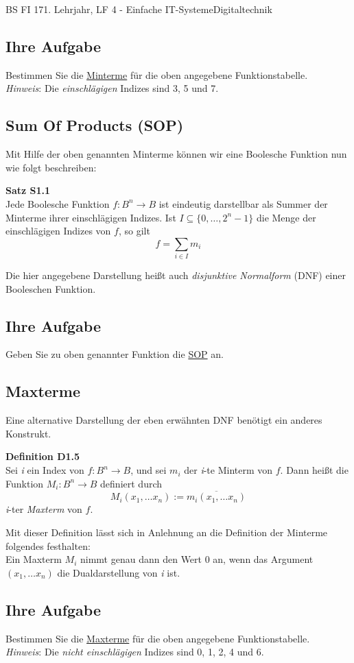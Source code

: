 \documentclass[11pt,twocolumn,oneside,openany,headings=optiontotoc,11pt,numbers=noenddot]{article}
\begin{document}
\begin{worksheet}{BS FI 17}{1. Lehrjahr, LF 4 - Einfache IT-Systeme}{Digitaltechnik}
		\subsection*{Ihre Aufgabe} Bestimmen Sie die \underline{Minterme} für die oben angegebene Funktionstabelle.\\
		\textit{Hinweis}: Die \textit{einschlägigen} Indizes sind 3, 5 und 7.
		\subsection{Sum Of Products (SOP)} Mit Hilfe der oben genannten Minterme können wir eine Boolesche Funktion nun wie folgt beschreiben:
		\begin{framed}
			\textbf{Satz S1.1}\\ Jede Boolesche Funktion \(f: B^n \rightarrow B\) ist eindeutig darstellbar als Summer der Minterme ihrer einschlägigen Indizes. Ist \(I \subseteq \{0,\ldots , 2^n -1\}\) die Menge der einschlägigen Indizes von \(f\), so gilt
			\[f = \sum_{i\in I} m_i\]
		\end{framed}
		Die hier angegebene Darstellung heißt auch \textit{disjunktive Normalform} (DNF) einer Booleschen Funktion.
		\subsection*{Ihre Aufgabe} Geben Sie zu oben genannter Funktion die \underline{SOP} an.
		\subsection{Maxterme} Eine alternative Darstellung der eben erwähnten DNF benötigt ein anderes Konstrukt.
		\begin{framed}
			\textbf{Definition D1.5}\\Sei \textit{i} ein Index von \(f:B^n\rightarrow B\), und sei \(m_i\) der \textit{i}-te Minterm von \(f\). Dann heißt die Funktion \(M_i: B^n \rightarrow B\) definiert durch
			\[M_i(x_1,\ldots x_n) := \overline{m_i(x_1,\ldots x_n)}\]
			\textit{i}-ter \textit{Maxterm} von \(f\).
		\end{framed}
		Mit dieser Definition lässt sich in Anlehnung an die Definition der Minterme folgendes festhalten:\\ Ein Maxterm \(M_i\) nimmt genau dann den Wert 0 an, wenn das Argument \((x_1,\ldots x_n)\) die Dualdarstellung von \textit{i} ist.
		\subsection*{Ihre Aufgabe} Bestimmen Sie die \underline{Maxterme} für die oben angegebene Funktionstabelle.\\
		\textit{Hinweis}: Die \textit{nicht einschlägigen} Indizes sind 0, 1, 2, 4 und 6.

\end{worksheet}
\end{document}
